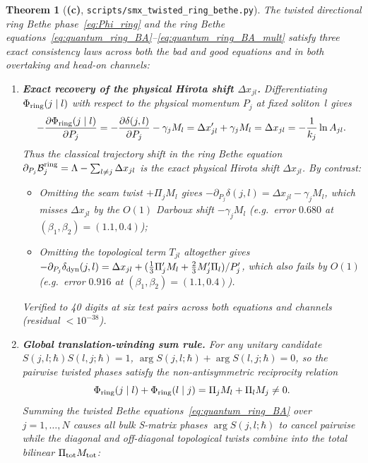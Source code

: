 \documentclass[11pt,a4paper]{article}
\newcommand{\Lc}{\textsf{\textbf{(c)}}}
\newcommand{\smxring}{\texttt{scripts/\allowbreak smx\_\allowbreak twisted\_\allowbreak ring\_\allowbreak bethe.py}}
\newtheorem{theorem}[proposition]{Theorem}
\theoremstyle{remark}
\begin{document}
\begin{theorem}[\Lc, \smxring]\label{thm:ring_bethe}
The twisted directional ring Bethe phase~\eqref{eq:Phi_ring} and the ring Bethe equations~\eqref{eq:quantum_ring_BA}--\eqref{eq:quantum_ring_BA_mult} satisfy three exact consistency laws across both the bad and good equations and in both overtaking and head-on channels:
\begin{enumerate}
\item \textbf{Exact recovery of the physical Hirota shift $\Delta x_{jl}$.}
Differentiating $\Phi_{\rm ring}(j\mid l)$ with respect to the physical momentum $P_j$ at fixed soliton~$l$ gives
\begin{equation}\label{eq:dPhi_ring_dPj}
-\frac{\partial\Phi_{\rm ring}(j\mid l)}{\partial P_j}
=-\frac{\partial\delta(j,l)}{\partial P_j}-\gamma_j M_l
=\Delta x_{jl}'+\gamma_j M_l
=\Delta x_{jl}=-\frac{1}{k_j}\ln A_{jl}.
\end{equation}
Thus the classical trajectory shift in the ring Bethe equation $\partial_{P_j}\mathcal B_j^{\rm ring}=\Lambda-\sum_{l\neq j}\Delta x_{jl}$ is the \emph{exact physical Hirota shift} $\Delta x_{jl}$. By contrast:
\begin{itemize}
\item Omitting the seam twist $+\Pi_j M_l$ gives $-\partial_{P_j}\delta(j,l)=\Delta x_{jl}-\gamma_j M_l$, which misses $\Delta x_{jl}$ by the $O(1)$ Darboux shift $-\gamma_j M_l$ (e.g.\ error $0.680$ at $(\beta_1,\beta_2)=(1.1,0.4)$);
\item Omitting the topological term $T_{jl}$ altogether gives $-\partial_{P_j}\delta_{\rm dyn}(j,l)=\Delta x_{jl}+(\frac13\Pi_j' M_l+\frac23 M_j'\Pi_l)/P_j'$, which also fails by $O(1)$ (e.g.\ error $0.916$ at $(\beta_1,\beta_2)=(1.1,0.4)$).
\end{itemize}
Verified to 40 digits at six test pairs across both equations and channels (residual $<10^{-38}$).
\item \textbf{Global translation-winding sum rule.}
For any unitary candidate $S(j,l;\hbar)S(l,j;\hbar)=1$, $\arg S(j,l;\hbar)+\arg S(l,j;\hbar)=0$, so the pairwise twisted phases satisfy the non-antisymmetric reciprocity relation
\begin{equation}\label{eq:Phi_reciprocity}
\Phi_{\rm ring}(j\mid l)+\Phi_{\rm ring}(l\mid j)=\Pi_j M_l+\Pi_l M_j\neq 0.
\end{equation}
Summing the twisted Bethe equations~\eqref{eq:quantum_ring_BA} over $j=1,\dots,N$ causes all bulk S-matrix phases $\arg S(j,l;\hbar)$ to cancel pairwise while the diagonal and off-diagonal topological twists combine into the total bilinear $\Pi_{\rm tot}M_{\rm tot}$:

\end{enumerate}
\end{theorem}
\end{document}
